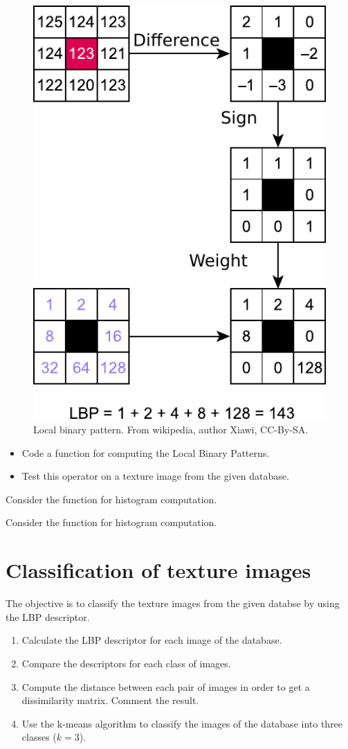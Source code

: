 \begin{figure}[h]
\centering
\includegraphics[width=.4\linewidth]{Lbp_computation.pdf}

\caption{Local binary pattern. From wikipedia, author Xiawi, CC-By-SA.}
\end{figure}
\begin{qbox}
\begin{itemize}
\item
Code a function for computing the Local Binary Patterns.
\item Test this operator on a texture image from the given database.
\end{itemize}
\end{qbox}

\begin{mcomment}
\begin{mremark}
Consider the function  for histogram computation.
\end{mremark}
\end{mcomment}

\begin{pcomment}
\begin{premark}
Consider the function  for histogram computation.
\end{premark}
\end{pcomment}


\section{Classification of texture images}
The objective is to classify the texture images from the given databse by using the LBP descriptor.
\begin{qbox}
\begin{enumerate}
\item Calculate the LBP descriptor for each image of the database.
\item Compare the descriptors for each class of images. 
\item Compute the distance between each pair of images in order to get a dissimilarity matrix. Comment the result.
\item Use the k-means algorithm to classify the images of the database into three classes ($k=3$). 
\end{enumerate}
\end{qbox}

